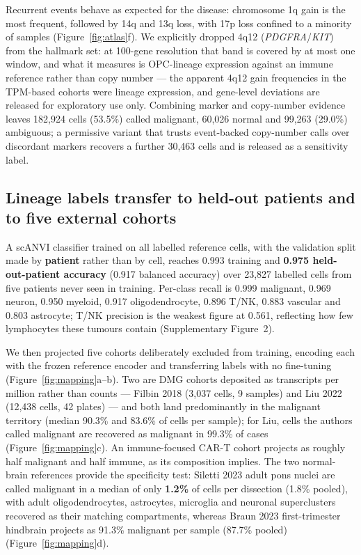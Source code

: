 \documentclass[12pt,a4paper]{article}
\begin{document}
Recurrent events behave as expected for the disease: chromosome 1q gain is the most frequent, followed by 14q and 13q
loss, with 17p loss confined to a minority of samples (Figure~\ref{fig:atlas}f). We explicitly dropped 4q12
(\textit{PDGFRA}/\textit{KIT}) from the hallmark set: at 100-gene resolution that band is covered by at most one
window, and what it measures is OPC-lineage expression against an immune reference rather than copy number --- the
apparent 4q12 gain frequencies in the TPM-based cohorts were lineage expression, and gene-level deviations are released
for exploratory use only. Combining marker and copy-number evidence leaves 182,924 cells (53.5\%) called malignant,
60,026 normal and 99,263 (29.0\%) ambiguous; a permissive variant that trusts event-backed copy-number calls over
discordant markers recovers a further 30,463 cells and is released as a sensitivity label.



\subsection{Lineage labels transfer to held-out patients and to five external cohorts}

A scANVI classifier \citep{xu2021probabilistic} trained on all labelled reference cells, with the validation split made
by \textbf{patient} rather than by cell, reaches 0.993 training and \textbf{0.975 held-out-patient accuracy} (0.917
balanced accuracy) over 23,827 labelled cells from five patients never seen in training. Per-class recall is 0.999
malignant, 0.969 neuron, 0.950 myeloid, 0.917 oligodendrocyte, 0.896 T/NK, 0.883 vascular and 0.803 astrocyte; T/NK
precision is the weakest figure at 0.561, reflecting how few lymphocytes these tumours contain (Supplementary
Figure~2).

We then projected five cohorts deliberately excluded from training, encoding each with the frozen reference encoder and
transferring labels with no fine-tuning (Figure~\ref{fig:mapping}a--b). Two are DMG cohorts deposited as transcripts
per million rather than counts --- Filbin 2018 (3,037 cells, 9 samples) \citep{filbin2018developmental} and Liu 2022
(12,438 cells, 42 plates) \citep{liu2022landscape} --- and both land predominantly in the malignant territory (median
90.3\% and 83.6\% of cells per sample); for Liu, cells the authors called malignant are recovered as malignant in
99.3\% of cases (Figure~\ref{fig:mapping}c). An immune-focused CAR-T cohort projects as roughly half malignant and half
immune, as its composition implies. The two normal-brain references provide the specificity test: Siletti 2023 adult
pons nuclei \citep{siletti2023transcriptomic} are called malignant in a median of only \textbf{1.2\%} of cells per
dissection (1.8\% pooled), with adult oligodendrocytes, astrocytes, microglia and neuronal superclusters recovered as their matching
compartments, whereas Braun 2023 first-trimester hindbrain \citep{braun2023comprehensive} projects as 91.3\% malignant per
sample (87.7\% pooled)
(Figure~\ref{fig:mapping}d).
\end{document}
